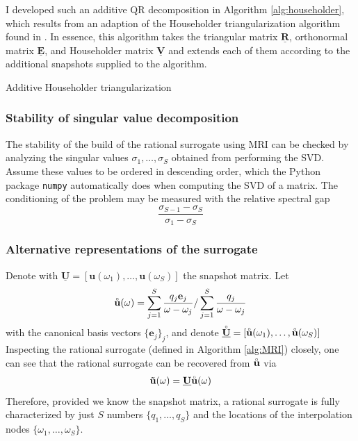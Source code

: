 \documentclass[11pt, a4paper]{article}
\begin{document}
I developed such an additive QR decomposition in Algorithm \ref{alg:householder},
which results from an adaption of the Householder triangularization algorithm
found in \citep{householder}. In essence, this algorithm takes the triangular
matrix $\mathbf{\underline{R}}$, orthonormal matrix $\mathbf{\underline{E}}$,
and Householder matrix $\mathbf{\underline{V}}$ and extends each of them according
to the additional snapshots supplied to the algorithm.

\begin{algorithm}
    \caption{Additive Householder triangularization} \label{alg:householder}
    
\end{algorithm}


\subsubsection{Stability of singular value decomposition}
\label{subsubsec:svd}
The stability of the build of the rational surrogate using \acrshort{MRI}
can be checked by analyzing the singular values $\sigma_1, \dots, \sigma_S$ 
obtained from performing the \acrshort{SVD}. Assume these values to be
ordered in descending order, which the Python package
\texttt{numpy} automatically does when computing the \acrshort{SVD} of a matrix. 
The conditioning of the problem may be measured with the relative
spectral gap \cite{davidePHD}
\begin{equation}
    \frac{\sigma_{S-1} - \sigma_S}{\sigma_1 - \sigma_S}
\end{equation}

\subsubsection{Alternative representations of the surrogate}
\label{subsubsec:u-ring}
Denote with $\mathbf{\underline{U}} = [\mathbf{u}(\omega_1), \dots, \mathbf{u}(\omega_S)]$
the snapshot matrix. Let 
\begin{equation}
    \accentset{\circ}{\mathbf{u}}(\omega) = \sum_{j=1}^S \frac{q_j \mathbf{e}_j}{\omega - \omega_j}
    / \sum_{j=1}^S \frac{q_j}{\omega - \omega_j} \label{equ:u-ring}
\end{equation}
with the canonical basis vectors $\{ \mathbf{e}_j \}_j$, and denote
$\accentset{\circ}{\mathbf{\underline{U}}} = [\accentset{\circ}{\mathbf{u}}(\omega_1), \dots, \accentset{\circ}{\mathbf{u}}(\omega_S)]$
Inspecting the rational surrogate (defined in Algorithm \ref{alg:MRI}) closely,
one can see that the rational surrogate can be recovered from $\accentset{\circ}{\mathbf{u}}$
via
\begin{equation}
    \mathbf{\tilde{u}}(\omega) = \mathbf{\underline{U}} \accentset{\circ}{\mathbf{u}}(\omega)
\end{equation}
Therefore, provided we know the snapshot matrix, a rational surrogate is
fully characterized by just $S$ numbers $\{q_1, \dots, q_S\}$
and the locations of the interpolation nodes $\{\omega_1, \dots, \omega_S\}$.
\end{document}
